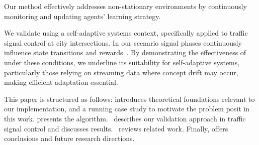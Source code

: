 Our method effectively addresses non-stationary environments by continuously monitoring and 
updating agents' learning strategy. 

We validate \adaptiverl using a self-adaptive systems context, specifically applied to traffic signal 
control at city intersections. In our scenario signal phases continuously influence state transitions 
and rewards~\cite{meta-rl-traffic}. By demonstrating the effectiveness of \adaptiverl under these conditions, we underline its suitability for self-adaptive systems, particularly those relying on streaming data where concept drift may occur, making efficient adaptation essential.

This paper is structured as follows:  introduces theoretical foundations relevant to 
our implementation, and a running case study to motivate the problem posit in this work.  presents the \adaptiverl algorithm.~ describes our validation approach in traffic signal control and discusses results.~ reviews related work. Finally,  offers conclusions and future research directions.





\endinput

